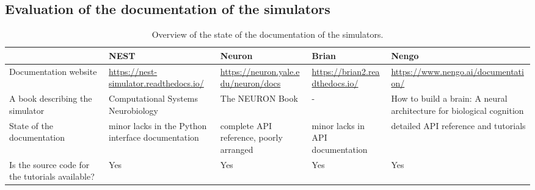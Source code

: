 \begin{landscape}
    \chapter{Evaluation of the documentation of the simulators}
    \begin{table}[htbp]
        \centering
        \begin{tabularx}{\linewidth}{|>{\raggedright\arraybackslash}X|>{\raggedright\arraybackslash}X|>{\raggedright\arraybackslash}X|>{\raggedright\arraybackslash}X|>{\raggedright\arraybackslash}X|}
            \hline
                 & NEST & Neuron & Brian & Nengo \\
            \hline
                Documentation website & \url{https://nest-simulator.readthedocs.io/} & \url{https://neuron.yale.edu/neuron/docs} & \url{https://brian2.readthedocs.io/} & \url{https://www.nengo.ai/documentation/} \\
            \hline
                A book describing the simulator & Computational Systems Neurobiology \cite{lenovereComputationalSystemsNeurobiology2012}
                & The NEURON Book \cite{carnevaleNEURONBook06} & - & How to build a brain: A neural architecture for biological cognition \cite{eliasmithHowBuild13} \\
            \hline
                State of the documentation & minor lacks in the Python interface documentation & complete API reference, poorly arranged & minor lacks in API documentation & detailed API reference and tutorials \\
            \hline
                Is the source code for the tutorials available? & Yes & Yes & Yes & Yes \\
            \hline
                
                
        \end{tabularx}
        \caption{Overview of the state of the documentation of the simulators. }
        \label{tab:documentation}
    \end{table}
\end{landscape}